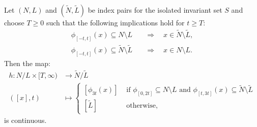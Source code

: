 \begin{lemma} \label{lem: index invariants lemma 2} Let $(N,L)$ and $(\tilde{N},\tilde{L})$ be index pairs for the isolated invariant set $S$ and choose $T\geq 0$ such that the following implications hold for $t\geq T$:
\begin{align}
\phi_{[-t,t]}(x) \subseteq N\setminus L \quad &\Rightarrow \quad x \in \tilde{N}\setminus \tilde{L}, \label{eq: lemma 2 1st implic}\\
\phi_{[-t,t]}(x) \subseteq  \tilde{N}\setminus \tilde{L} \quad &\Rightarrow \quad x \in N\setminus L. \label{eq: lemma 2 2nd implic}
\end{align}
Then the map:
\begin{align*}
h:N/L \times [T,\infty) & \to \tilde{N}/\tilde{L} \\
([x],t) & \mapsto 
\begin{cases}
[\phi_{3t}(x)] & \text{ if } \phi_{[0,2t]}\subseteq N\setminus L \text{ and } \phi_{[t,3t]}(x)\subseteq \tilde{N}\setminus \tilde{L}\\
[\tilde{L}] & \text{ otherwise,}
\end{cases}
\end{align*}
is continuous.
\end{lemma}
